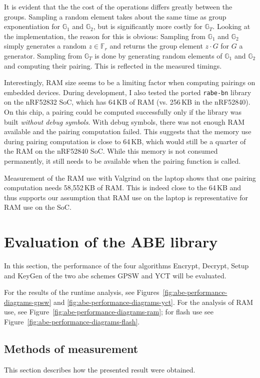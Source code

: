 It is evident that the the cost of the operations differs greatly between the groups. 
Sampling a random element takes about the same time as group exponentiation for $\mathbb{G}_1$ and $\mathbb{G}_2$, but is significantly more costly for $\mathbb{G}_T$.
Looking at the implementation, the reason for this is obvious: Sampling from $\mathbb{G}_1$ and $\mathbb{G}_2$ simply generates a random $z \in \mathbb{F}_r$ and returns the group element $z \cdot G$ for $G$ a generator.
Sampling from $\mathbb{G}_T$ is done by generating random elements of $\mathbb{G}_1$ and $\mathbb{G}_2$ and computing their pairing.
This is reflected in the measured timings.

Interestingly, RAM size seems to be a limiting factor when computing pairings on embedded devices.
During development, I also tested the ported \texttt{rabe-bn} library on the nRF52832 SoC, which has 64\,KB of RAM (vs. 256\,KB in the nRF52840). 
On this chip, a pairing could be computed successfully only if the library was built \emph{without debug symbols}.
With debug symbols, there was not enough RAM available and the pairing computation failed.
This suggests that the memory use during pairing computation is close to 64\,KB, which would still be a quarter of the RAM on the nRF52840 SoC.
While this memory is not consumed permanently, it still needs to be available when the pairing function is called.

Measurement of the RAM use with Valgrind on the laptop shows that one pairing computation needs 58,552\,KB of RAM.
This is indeed close to the 64\,KB and thus supports our assumption that RAM use on the laptop is representative for RAM use on the SoC.

\section{Evaluation of the ABE library}\label{sec:abe-performance}

In this section, the performance of the four algorithms Encrypt, Decrypt, Setup and KeyGen of the two \acrshort{abe} schemes GPSW and YCT will be evaluated.

For the results of the runtime analysis, see Figures~\ref{fig:abe-performance-diagrams-gpsw} and \ref{fig:abe-performance-diagrams-yct}. 
For the analysis of RAM use, see Figure~\ref{fig:abe-performance-diagrams-ram}; for flash use see Figure~\ref{fig:abe-performance-diagrams-flash}. 


\subsection{Methods of measurement}
This section describes how the presented result were obtained.

